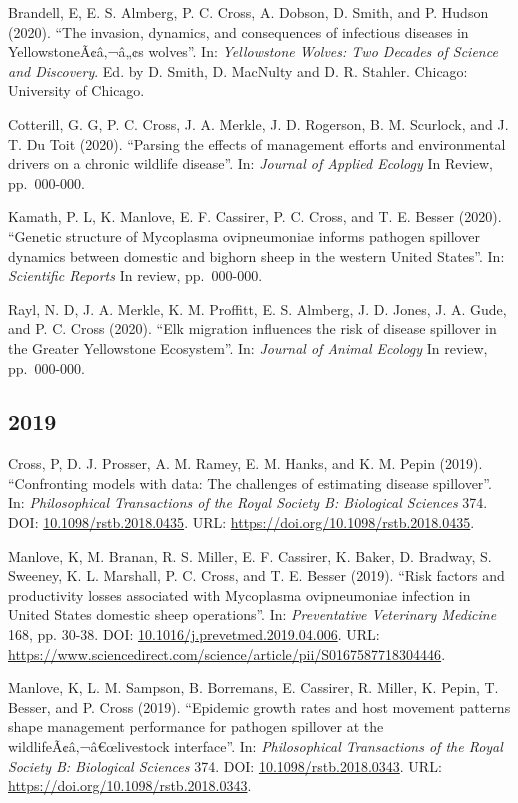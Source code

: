 \documentclass[12pt,]{article}
\begin{document}
Brandell, E, E. S. Almberg, P. C. Cross, A. Dobson, D. Smith, and P.
Hudson (2020). ``The invasion, dynamics, and consequences of infectious
diseases in YellowstoneÃ¢â‚¬â„¢s wolves''. In: \emph{Yellowstone Wolves:
Two Decades of Science and Discovery}. Ed. by D. Smith, D. MacNulty and
D. R. Stahler. Chicago: University of Chicago.

Cotterill, G. G, P. C. Cross, J. A. Merkle, J. D. Rogerson, B. M.
Scurlock, and J. T. Du Toit (2020). ``Parsing the effects of management
efforts and environmental drivers on a chronic wildlife disease''. In:
\emph{Journal of Applied Ecology} In Review, pp.~000-000.

Kamath, P. L, K. Manlove, E. F. Cassirer, P. C. Cross, and T. E. Besser
(2020). ``Genetic structure of Mycoplasma ovipneumoniae informs pathogen
spillover dynamics between domestic and bighorn sheep in the western
United States''. In: \emph{Scientific Reports} In review, pp.~000-000.

Rayl, N. D, J. A. Merkle, K. M. Proffitt, E. S. Almberg, J. D. Jones, J.
A. Gude, and P. C. Cross (2020). ``Elk migration influences the risk of
disease spillover in the Greater Yellowstone Ecosystem''. In:
\emph{Journal of Animal Ecology} In review, pp.~000-000.

\hypertarget{section}{%
\subsection{2019}\label{section}}

Cross, P, D. J. Prosser, A. M. Ramey, E. M. Hanks, and K. M. Pepin
(2019). ``Confronting models with data: The challenges of estimating
disease spillover''. In: \emph{Philosophical Transactions of the Royal
Society B: Biological Sciences} 374. DOI:
\href{https://doi.org/10.1098\%2Frstb.2018.0435}{10.1098/rstb.2018.0435}.
URL: \url{https://doi.org/10.1098/rstb.2018.0435}.

Manlove, K, M. Branan, R. S. Miller, E. F. Cassirer, K. Baker, D.
Bradway, S. Sweeney, K. L. Marshall, P. C. Cross, and T. E. Besser
(2019). ``Risk factors and productivity losses associated with
Mycoplasma ovipneumoniae infection in United States domestic sheep
operations''. In: \emph{Preventative Veterinary Medicine} 168, pp.
30-38. DOI:
\href{https://doi.org/10.1016\%2Fj.prevetmed.2019.04.006}{10.1016/j.prevetmed.2019.04.006}.
URL:
\url{https://www.sciencedirect.com/science/article/pii/S0167587718304446}.

Manlove, K, L. M. Sampson, B. Borremans, E. Cassirer, R. Miller, K.
Pepin, T. Besser, and P. Cross (2019). ``Epidemic growth rates and host
movement patterns shape management performance for pathogen spillover at
the wildlifeÃ¢â‚¬â€œlivestock interface''. In: \emph{Philosophical
Transactions of the Royal Society B: Biological Sciences} 374. DOI:
\href{https://doi.org/10.1098\%2Frstb.2018.0343}{10.1098/rstb.2018.0343}.
URL: \url{https://doi.org/10.1098/rstb.2018.0343}.
\end{document}
